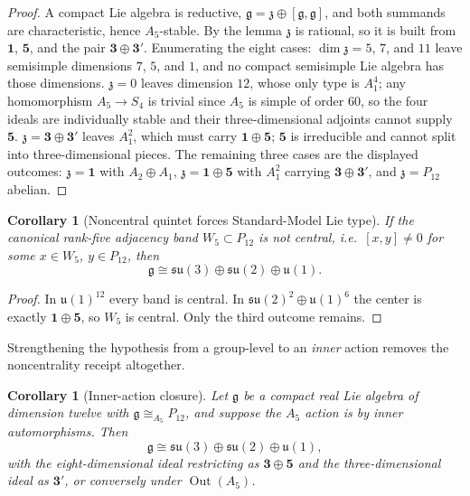 \documentclass[11pt]{article}
\newtheorem{corollary}[theorem]{Corollary}
\begin{document}
\begin{proof}
A compact Lie algebra is reductive, \(\mathfrak g=\mathfrak z\oplus[\mathfrak
g,\mathfrak g]\), and both summands are characteristic, hence \(A_5\)-stable.
By the lemma \(\mathfrak z\) is rational, so it is built from \(\mathbf1\),
\(\mathbf5\), and the pair \(\mathbf3\oplus\mathbf3'\). Enumerating the eight
cases: \(\dim\mathfrak z=5\), \(7\), and \(11\) leave semisimple dimensions
\(7\), \(5\), and \(1\), and no compact semisimple Lie algebra has those
dimensions. \(\mathfrak z=0\) leaves dimension \(12\), whose only type is
\(A_1^4\); any homomorphism \(A_5\to S_4\) is trivial since \(A_5\) is simple
of order \(60\), so the four ideals are individually stable and their
three-dimensional adjoints cannot supply \(\mathbf5\). \(\mathfrak
z=\mathbf3\oplus\mathbf3'\) leaves \(A_1^2\), which must carry
\(\mathbf1\oplus\mathbf5\); \(\mathbf5\) is irreducible and cannot split into
three-dimensional pieces. The remaining three cases are the displayed
outcomes: \(\mathfrak z=\mathbf1\) with \(A_2\oplus A_1\), \(\mathfrak
z=\mathbf1\oplus\mathbf5\) with \(A_1^2\) carrying
\(\mathbf3\oplus\mathbf3'\), and \(\mathfrak z=P_{12}\) abelian.
\end{proof}

\begin{corollary}[Noncentral quintet forces Standard-Model Lie type]
If the canonical rank-five adjacency band \(W_5\subset P_{12}\) is not central,
i.e.\ \([x,y]\neq0\) for some \(x\in W_5\), \(y\in P_{12}\), then
\[
  \mathfrak g\cong\mathfrak{su}(3)\oplus\mathfrak{su}(2)\oplus\mathfrak u(1).
\]
\end{corollary}

\begin{proof}
In \(\mathfrak u(1)^{12}\) every band is central. In
\(\mathfrak{su}(2)^2\oplus\mathfrak u(1)^6\) the center is exactly
\(\mathbf1\oplus\mathbf5\), so \(W_5\) is central. Only the third outcome
remains.
\end{proof}

Strengthening the hypothesis from a group-level to an \emph{inner} action
removes the noncentrality receipt altogether.

\begin{corollary}[Inner-action closure]
Let \(\mathfrak g\) be a compact real Lie algebra of dimension twelve with
\(\mathfrak g\cong_{A_5}P_{12}\), and suppose the \(A_5\) action is by inner
automorphisms. Then
\[
  \mathfrak g\cong\mathfrak{su}(3)\oplus\mathfrak{su}(2)\oplus\mathfrak u(1),
\]
with the eight-dimensional ideal restricting as \(\mathbf3\oplus\mathbf5\) and
the three-dimensional ideal as \(\mathbf3'\), or conversely under
\(\operatorname{Out}(A_5)\).
\end{corollary}
\end{document}
